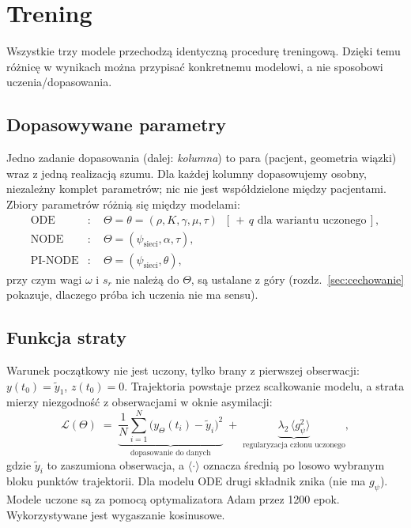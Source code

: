 \documentclass[11pt,a4paper]{article}
\begin{document}
\section{Trening}
\label{sec:trening}

Wszystkie trzy modele przechodzą identyczną procedurę treningową. Dzięki temu różnicę w wynikach można przypisać konkretnemu modelowi, a nie sposobowi uczenia/dopasowania.

\subsection{Dopasowywane parametry}

Jedno zadanie dopasowania (dalej: \emph{kolumna}) to para (pacjent, geometria wiązki)
wraz z jedną realizacją szumu. Dla każdej kolumny dopasowujemy osobny, niezależny komplet
parametrów; nic nie jest współdzielone między pacjentami. Zbiory parametrów różnią się między modelami:
\begin{align}
\text{ODE}     &:\quad \Theta = \theta = (\rho, K, \gamma, \mu, \tau)
                  \;\;[\,{+}\,q \text{ dla wariantu uczonego}\,], \\
\text{NODE}    &:\quad \Theta = (\psi_{\mathrm{sieci}}, \alpha, \tau), \\
\text{PI-NODE} &:\quad \Theta = (\psi_{\mathrm{sieci}}, \theta),
\end{align}
przy czym wagi $\omega$ i $s_r$ nie należą do $\Theta$, są ustalane z góry
(rozdz.~\ref{sec:cechowanie} pokazuje, dlaczego próba ich uczenia nie ma sensu).

\subsection{Funkcja straty}

Warunek początkowy nie jest uczony, tylko brany z pierwszej obserwacji:
$y(t_0) = \tilde y_1$, $z(t_0) = 0$. Trajektoria powstaje przez scałkowanie modelu, a
strata mierzy niezgodność z obserwacjami w oknie asymilacji:
\begin{equation}
\mathcal{L}(\Theta) \;=\; \underbrace{\frac{1}{N}\sum_{i=1}^{N}
\big(y_\Theta(t_i) - \tilde y_i\big)^2}_{\text{dopasowanie do danych}}
\;+\; \underbrace{\lambda_{2}\,\big\langle g_\psi^2 \big\rangle}_{\text{regularyzacja członu uczonego}},
\label{eq:strata}
\end{equation}
gdzie $\tilde y_i$ to zaszumiona obserwacja, a $\langle\cdot\rangle$ oznacza średnią po
losowo wybranym bloku punktów trajektorii. Dla modelu ODE drugi składnik
znika (nie ma $g_\psi$). Modele uczone są za pomocą optymalizatora Adam przez 1200 epok. Wykorzystywane jest wygaszanie kosinusowe.
\end{document}
